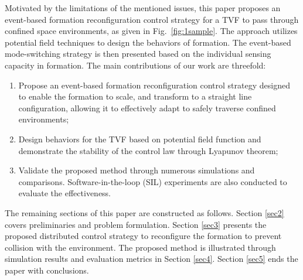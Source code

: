 Motivated by the limitations of the mentioned issues, this paper proposes an event-based formation reconfiguration control strategy for a TVF to pass through confined space environments, as given in Fig.~\ref{fig:1sample}. The approach utilizes potential field techniques to design the behaviors of formation. The event-based mode-switching strategy is then presented based on the individual sensing capacity in formation. The main contributions of our work are threefold:
\begin{enumerate}
    \item Propose an event-based formation reconfiguration control strategy designed to enable the formation to scale, and transform to a straight line configuration, allowing it to effectively adapt to safely traverse confined environments;
        \item Design behaviors for the TVF based on potential field function and demonstrate the stability of the control law through Lyapunov theorem;
    \item Validate the proposed method through numerous simulations and comparisons. Software-in-the-loop (SIL) experiments are also conducted to evaluate the effectiveness.
\end{enumerate}

The remaining sections of this paper are constructed as follows. Section \ref{sec2} covers preliminaries and problem formulation. Section \ref{sec3} presents the proposed distributed control strategy to reconfigure the formation to prevent collision with the environment. The proposed method is illustrated through simulation results and evaluation metrics in Section \ref{sec4}. Section \ref{sec5} ends the paper with conclusions.

